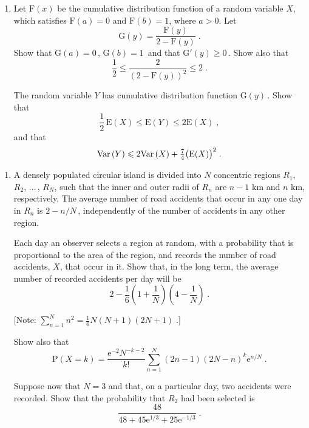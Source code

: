 \documentclass[a4, 11pt]{report}
\newlength{\qspace}
\newcounter{qnumber}
\newenvironment{question}%
 {\vspace{\qspace}
  \begin{enumerate}[\bfseries 1\quad][10]%
    \setcounter{enumi}{\value{qnumber}}%
    \item%
 }
{
  \end{enumerate}
  \filbreak
  \stepcounter{qnumber}
 }
\def\e{{\mathrm e}}
\def\E{{\mathrm E}}
\def\F{{\mathrm F}}
\def\G{{\mathrm G}}
\def\P{{\mathrm P}}
\def\le{\leqslant}
\def\ge{\geqslant}
\def\var{{\rm Var}\,}
\newcommand{\ts}{\textstyle}
\begin{document}
\begin{question}
Let $\F(x)$ be the cumulative distribution function of a random variable
$X$, which satisfies $\F(a)=0$ and $\F(b)=1$,  where $a>0$.  Let
\[
\G(y) = \frac{\F(y)}{2-\F(y)}\;.
\]
Show that $\G(a)=0\,$, $\G(b)=1\,$ and that $\G'(y)\ge0\,$.
Show also that
\[
\frac12 \le \frac2{(2-\F(y))^2} \le 2\;.
\]

The random variable $Y$ has cumulative distribution function $\G(y)\,$. Show that
\[
{\ts \frac12} \,\E(X) \le \E(Y) \le 2 \E(X) \;,
\]
and that
 \[
\var(Y) \le 2\var(X) +{\ts \frac 74} \big(\E(X)\big)^2\;.
\]
\end{question}

\begin{question}
A densely populated circular island is divided into $N$ concentric 
regions $R_1$, $R_2$, $\ldots\,$, $R_N$, such that the inner and outer
radii of $R_n$ are $n-1$ km and $n$ km, respectively. The average number
of road accidents  that occur in any one day in $R_n$ is $2-n/N\,$, 
independently of the number of accidents in any other region.

Each day an observer selects a region at random, with a probability that
is proportional to the area of the region, and records the number of 
road accidents, $X$, that occur in it. Show that, in the long term, the
average number of recorded accidents per day will be
\[
2-\frac16\left(1+\frac1N\right)\left(4-\frac1N\right)\;.
\]

[Note: $\sum\limits_{n=1}^N n^2 = \frac16 N(N+1)(2N+1) \;$.]

Show also that 
\[
\P(X=k) = \frac{\e^{-2}N^{-k-2}}{k!}\sum_{n=1}^N (2n-1)(2N-n)^k\e^{n/N} \;.
\]


Suppose now that $N=3$ and that, on a particular day, two accidents  were recorded.
Show that the probability that $R_2$ had been selected is 
\[
\frac{48}{48 + 45\e^{1/3} +25 \e^{-1/3}}\;.
\]
\end{question}
	
\end{document}
